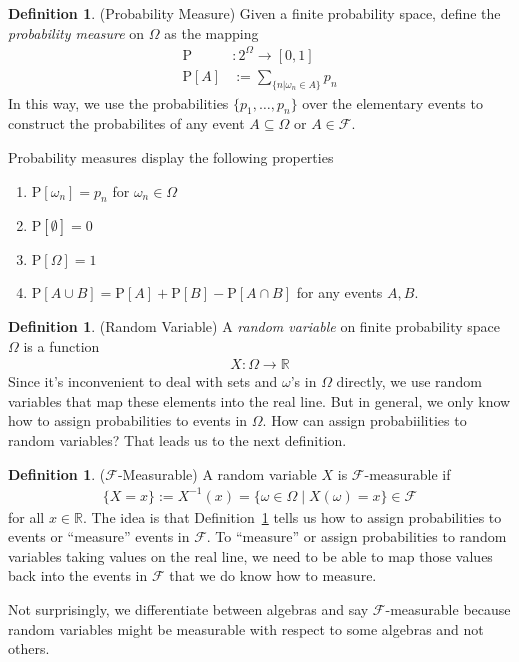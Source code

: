 \documentclass[12pt]{article}
\theoremstyle{plain}
\theoremstyle{definition}
\newtheorem{defn}[thm]{Definition}
\theoremstyle{remark}
\newcommand{\Prb}{\mathrm{P}}
\newcommand{\ra}{\rightarrow}
\newcommand{\sF}{\mathscr{F}}
\newcommand{\R}{\mathbb{R}}
\begin{document}
\begin{defn}{(Probability Measure)}
\label{defn:finitemeasure}
Given a finite probability space, define the \emph{probability measure}
on $\Omega$ as the mapping
\begin{align*}
  \Prb&: 2^\Omega \rightarrow [0,1] \\
  \Prb[A] &:= \sum_{\{n|\omega_n\in A\}} p_n
\end{align*}
In this way, we use the probabilities $\{p_1,\ldots,p_n\}$ over the
elementary events to construct the probabilites of any event
$A\subseteq \Omega$ or $A\in\sF$.

Probability measures display the following properties
\begin{enumerate}
  \item $\Prb[\omega_n]=p_n$ for $\omega_n\in\Omega$
  \item $\Prb[\emptyset] = 0$
  \item $\Prb[\Omega] = 1$
  \item $\Prb[A\cup B] = \Prb[A] + \Prb[B] - \Prb[A\cap B]$ for any
    events $A,B$.
\end{enumerate}
\end{defn}


\begin{defn}{(Random Variable)}
A \emph{random variable} on finite probability space $\Omega$ is a
function
\begin{align*}
  X: \Omega\ra \R
\end{align*}
Since it's inconvenient to deal with sets and $\omega$'s in $\Omega$
directly, we use random variables that map these elements into the real
line. But in general, we only know how to assign probabilities to
events in $\Omega$. How can assign probabiilities to random variables?
That leads us to the next definition.
\end{defn}

\begin{defn}{($\sF$-Measurable)}
A random variable $X$ is $\sF$-measurable if
\begin{align*}
  \{X=x\} :=
  X^{-1}(x) =
  \{\omega\in\Omega \; | \; X(\omega)=x\}
  \in \sF
\end{align*}
for all $x\in\R$. The idea is that Definition~\ref{defn:finitemeasure}
tells us how to assign probabilities to events or ``measure'' events in
$\sF$. To ``measure'' or assign probabilities to random variables
taking values on the real line, we need to be able to map those values
back into the events in $\sF$ that we do know how to measure.

Not surprisingly, we differentiate between algebras and say
$\sF$-measurable because random variables might be measurable with
respect to some algebras and not others.
\end{defn}
\end{document}
